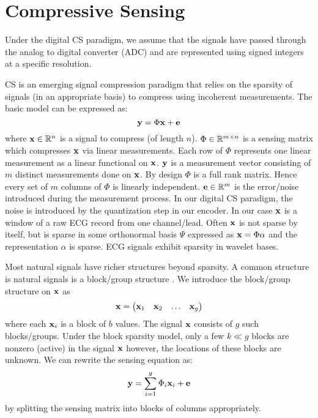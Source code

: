 \section{Compressive Sensing}
\label{appsec:cs}
Under the digital CS paradigm, we assume that the
signals have passed through the analog to digital
converter (ADC) and are represented using signed integers
at a specific resolution.

CS is an emerging signal compression paradigm that relies
on the sparsity of signals (in an appropriate basis)
to compress using incoherent measurements.
The basic model can be expressed as:
\begin{equation}
\mathbf{y} = \Phi \mathbf{x} + \mathbf{e}
\end{equation}
where $\mathbf{x} \in \mathbb{R}^n$ is a signal to compress
(of length $n$). $\Phi \in \mathbb{R}^{m \times n}$
is a sensing matrix which compresses $\mathbf{x}$
via linear measurements. Each row of $\Phi$
represents one linear measurement as a linear
functional on $\mathbf{x}$. $\mathbf{y}$ is a measurement
vector consisting of $m$ distinct measurements
done on $\mathbf{x}$. By design $\Phi$ is a full
rank matrix. Hence every set of $m$ columns of $\Phi$
is linearly independent. $\mathbf{e} \in \mathbb{R}^m$ is the
error/noise introduced during the measurement process.
In our digital CS paradigm, the noise is introduced
by the quantization step in our encoder.
In our case $\mathbf{x}$ is a window of a raw ECG record
from one channel/lead. 
Often $\mathbf{x}$ is not sparse by itself, but is sparse
in some orthonormal basis $\Psi$ expressed as
$\mathbf{x} = \Phi \alpha$ and the representation $\alpha$
is sparse. ECG signals exhibit sparsity in wavelet
bases.

Most natural signals have richer structures beyond
sparsity. A common structure is natural signals
is a block/group structure \cite{eldar2010block}. 
We introduce the block/group structure on $\mathbf{x}$ as
\begin{equation}
\mathbf{x} = \begin{pmatrix}
\mathbf{x}_1 & \mathbf{x}_2 & \dots & \mathbf{x}_g
\end{pmatrix}
\end{equation}
where each $\mathbf{x}_i$ is a block of $b$ values.
The signal $\mathbf{x}$ consists of $g$ such blocks/groups.
Under the block sparsity model, only a few $k \ll g$
blocks are nonzero (active) in the signal $\mathbf{x}$
however, the locations of these blocks are unknown.
We can rewrite the sensing equation as:
\begin{equation}
\mathbf{y} = \sum_{i=1}^g \Phi_i \mathbf{x}_i + \mathbf{e}
\end{equation}
by splitting the sensing matrix into blocks of columns appropriately.

